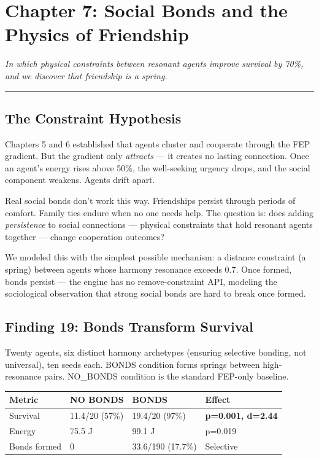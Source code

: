 \chapter{Chapter 7: Social Bonds and the Physics of Friendship}\label{chapter-7-social-bonds-and-the-physics-of-friendship}

\emph{In which physical constraints between resonant agents improve survival by 70\%, and we discover that friendship is a spring.}

\begin{center}\rule{0.5\linewidth}{0.5pt}\end{center}

\section{The Constraint Hypothesis}\label{the-constraint-hypothesis}

Chapters 5 and 6 established that agents cluster and cooperate through the FEP gradient. But the gradient only \emph{attracts} --- it creates no lasting connection. Once an agent's energy rises above 50\%, the well-seeking urgency drops, and the social component weakens. Agents drift apart.

Real social bonds don't work this way. Friendships persist through periods of comfort. Family ties endure when no one needs help. The question is: does adding \emph{persistence} to social connections --- physical constraints that hold resonant agents together --- change cooperation outcomes?

We modeled this with the simplest possible mechanism: a distance constraint (a spring) between agents whose harmony resonance exceeds 0.7. Once formed, bonds persist --- the engine has no remove-constraint API, modeling the sociological observation that strong social bonds are hard to break once formed.

\section{Finding 19: Bonds Transform Survival}\label{finding-19-bonds-transform-survival}

Twenty agents, six distinct harmony archetypes (ensuring selective bonding, not universal), ten seeds each. BONDS condition forms springs between high-resonance pairs. NO\_BONDS condition is the standard FEP-only baseline.

\begin{longtable}[]{@{}llll@{}}
\toprule\noalign{}
Metric & NO BONDS & BONDS & Effect \\
\midrule\noalign{}
\endhead
\bottomrule\noalign{}
\endlastfoot
Survival & 11.4/20 (57\%) & 19.4/20 (97\%) & \textbf{p=0.001, d=2.44} \\
Energy & 75.5 J & 99.1 J & p=0.019 \\
Bonds formed & 0 & 33.6/190 (17.7\%) & Selective \\
\end{longtable}

